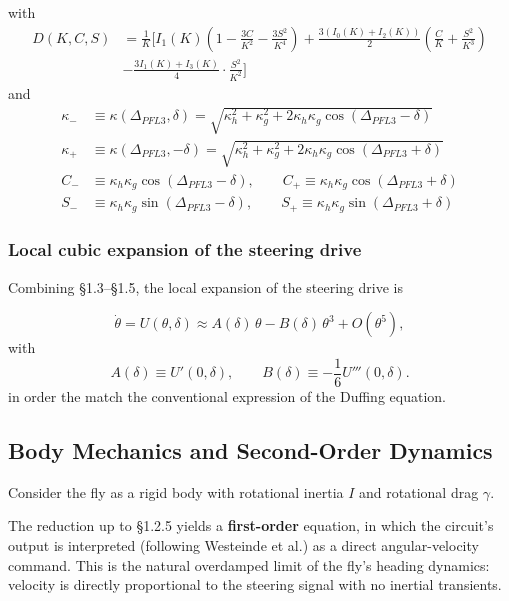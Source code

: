 \documentclass[11pt]{article}
\begin{document}
with
\begin{align*}
D(K,C,S) & =\frac{1}{K}\bigl[ I_{1}(K)\left( 1-\frac{3C}{K^{2}}-\frac{3S^{2}}{K^{4}} \right)+\frac{3(I_{0}(K)+I_{2}(K))}{2}\left( \frac{C}{K} + \frac{S^{2}}{K^{3}} \right) \\
 & -\frac{3I_{1}(K)+I_{3}(K)}{4}\cdot \frac{S^{2}}{K^{2}} \bigr]
\end{align*}
and
\begin{align*}
\kappa_- &\equiv \kappa(\Delta_{PFL3}, \delta) = \sqrt{\kappa_h^2 + \kappa_g^2 + 2\kappa_h\kappa_g\cos(\Delta_{PFL3} - \delta)} \\
\kappa_+ &\equiv \kappa(\Delta_{PFL3}, -\delta) = \sqrt{\kappa_h^2 + \kappa_g^2 + 2\kappa_h\kappa_g\cos(\Delta_{PFL3} + \delta)} \\
C_- &\equiv \kappa_h\kappa_g\cos(\Delta_{PFL3} - \delta), \qquad C_+ \equiv \kappa_h\kappa_g\cos(\Delta_{PFL3} + \delta) \\
S_- &\equiv \kappa_h\kappa_g\sin(\Delta_{PFL3} - \delta), \qquad S_+ \equiv \kappa_h\kappa_g\sin(\Delta_{PFL3} + \delta)
\end{align*}

\subsubsection{Local cubic expansion of the steering drive}

Combining §1.3--§1.5, the local expansion of the steering drive is

\begin{equation}
\dot{\theta}=U(\theta, \delta) \approx A(\delta)\,\theta - B(\delta)\,\theta^3 + O(\theta^5),
\end{equation}
with
\begin{equation*}
A(\delta) \equiv U'(0, \delta), \qquad B(\delta) \equiv -\frac{1}{6} U'''(0, \delta).
\end{equation*}
in order the match the conventional expression of the Duffing equation.

\subsection{Body Mechanics and Second-Order Dynamics}

Consider the fly as a rigid body with rotational inertia $I$ and rotational drag $\gamma$.

The reduction up to §1.2.5 yields a \textbf{first-order} equation, in which the circuit's output is interpreted (following Westeinde et al.) as a direct angular-velocity command. This is the natural overdamped limit of the fly's heading dynamics: velocity is directly proportional to the steering signal with no inertial transients.
\end{document}
